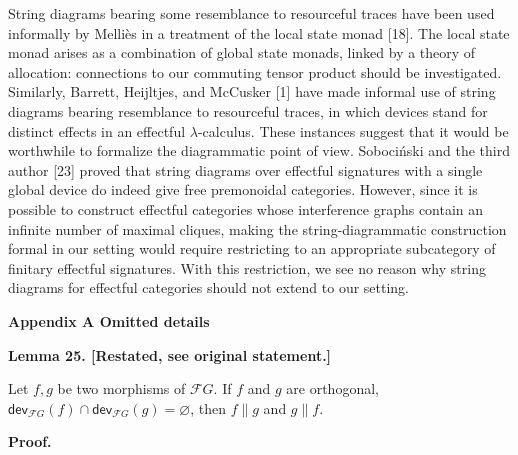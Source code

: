 String diagrams bearing some resemblance to resourceful traces have been used informally by Melliès in a treatment of the local state monad [18]. The local state monad arises as a combination of global state monads, linked by a theory of allocation: connections to our commuting tensor product should be investigated. Similarly, Barrett, Heijltjes, and McCusker [1] have made informal use of string diagrams bearing resemblance to resourceful traces, in which devices stand for distinct effects in an effectful $\lambda$-calculus. These instances suggest that it would be worthwhile to formalize the diagrammatic point of view. Sobociński and the third author [23] proved that string diagrams over effectful signatures with a single global device do indeed give free premonoidal categories. However, since it is possible to construct effectful categories whose interference graphs contain an infinite number of maximal cliques, making the string-diagrammatic construction formal in our setting would require restricting to an appropriate subcategory of finitary effectful signatures. With this restriction, we see no reason why string diagrams for effectful categories should not extend to our setting.\par
 
 


 
\par\medskip\noindent\textbf{Appendix A Omitted details}\par
 
 
 
\par\medskip\noindent\textbf{Lemma 25. [Restated, see original statement.]}\par
 
 
Let $f,g$ be two morphisms of $\mathcal{F}G$. If $f$ and $g$ are orthogonal, $\mathsf{dev}_{\mathcal{F}G}(f)\cap\mathsf{dev}_{\mathcal{F}G}(g)=\varnothing$, then $f\parallel g$ and $g\parallel f$.\par
 
 
 
 
 
\par\medskip\noindent\textbf{Proof.}\par
 
